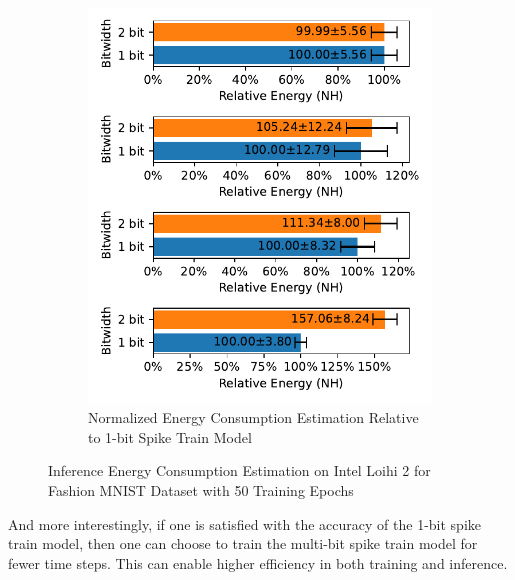 \begin{figure}[!htpb]
\begin{subfigure}[H]{0.48\textwidth}
                \includegraphics[width=\textwidth]{../firerate/FashionMNIST/plots/fashionmnist_test_relative_energy_nh.pdf}
                \caption{Normalized Energy Consumption Estimation Relative to 1-bit Spike Train Model}
            \end{subfigure}
            \caption{Inference Energy Consumption Estimation on Intel Loihi 2 for Fashion MNIST Dataset with 50 Training Epochs}
            \label{fig:inference_energy_nh_firerate}
        \end{figure}

        And more interestingly, if one is satisfied with the accuracy of the 1-bit spike train model, then one can choose to train the multi-bit spike train model for fewer time steps. This can enable higher efficiency in both training and inference. 


